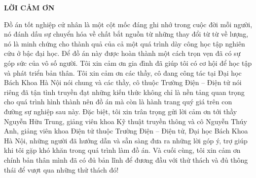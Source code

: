 \documentclass[../DoAn.tex]{subfiles}
\begin{document}
\begin{center}
    \Large{\textbf{LỜI CẢM ƠN}}\\
\end{center}
\vspace{1cm}
Đồ án tốt nghiệp cử nhân là một cột mốc đáng ghi nhớ trong cuộc đời mỗi người, nó đánh dấu sự chuyển hóa về chất bắt nguồn từ những thay đổi từ từ về lượng, nó là minh chứng cho thành quả của cả một quá trình dày công học tập nghiên cứu ở bậc đại học. Để đồ án này được hoàn thành một cách trọn vẹn đã có sự góp sức của vô số người. Tôi xin cảm ơn gia đình đã giúp tôi có cơ hội để học tập và phát triển bản thân. Tôi xin cảm ơn các thầy, cô đang công tác tại Đại học Bách Khoa Hà Nội nói chung và các thầy, cô thuộc Trường Điện – Điện tử nói riêng đã tận tình truyền đạt những kiến thức không chỉ là nền tảng quan trọng cho quá trình hình thành nên đồ án mà còn là hành trang quý giá trên con đường sự nghiệp sau này. Đặc biệt, tôi xin trân trọng gửi lời cảm ơn tới thầy Nguyễn Hữu Trung, giảng viên khoa Kỹ thuật truyền thông và cô Nguyễn Thúy Anh, giảng viên khoa Điện tử thuộc Trường Điện – Điện tử, Đại học Bách Khoa Hà Nội, những người đã hướng dẫn và sẵn sàng đưa ra những lời góp ý, trợ giúp khi tôi gặp khó khăn trong quá trình làm đồ án. Và cuối cùng, tôi xin cảm ơn chính bản thân mình đã có đủ bản lĩnh để đương đầu với thử thách và đủ thông thái để vượt qua những thử thách đó!
\end{document}
